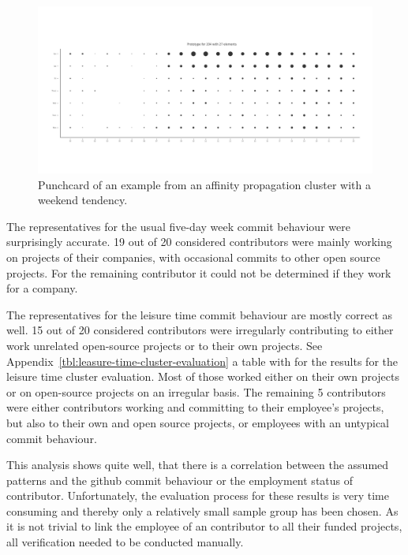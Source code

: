 \begin{figure}[H]
    \includegraphics[scale=0.32]{./graphs/analysis-affinity/204}
    \centering
    \caption{Punchcard of an example from an affinity propagation cluster with a weekend tendency.}\label{fig:random-sleep-rhythm}
\end{figure}

The representatives for the usual five-day week commit behaviour were surprisingly accurate.
19 out of 20 considered contributors were mainly working on projects of their companies, with occasional commits to other open source projects.
For the remaining contributor it could not be determined if they work for a company.



The representatives for the leisure time commit behaviour are mostly correct as well.
15 out of 20 considered contributors were irregularly contributing to either work unrelated open-source projects or to their own projects.
See Appendix~\ref{tbl:leasure-time-cluster-evaluation} a table with for the results for the leisure time cluster evaluation.
Most of those worked either on their own projects or on open-source projects on an irregular basis.
The remaining 5 contributors were either contributors working and committing to their employee's projects, but also to their own and open source projects, or employees with an untypical commit behaviour.

This analysis shows quite well, that there is a correlation between the assumed patterns and the github commit behaviour or the employment status of contributor.
Unfortunately, the evaluation process for these results is very time consuming and thereby only a relatively small sample group has been chosen.
As it is not trivial to link the employee of an contributor to all their funded projects, all verification needed to be conducted manually.

